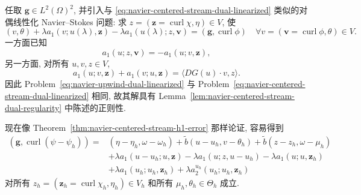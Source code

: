 \begin{Proof}
任取 $\boldsymbol g\in L^2(\Omega)^2$, 并引入与
\eqref{eq:navier-centered-stream-dual-linearized} 类似的对偶线性化 Navier--Stokes 问题:
求 $z=(\boldsymbol z=\operatorname{curl}\chi,\eta)\in V$, 使
\begin{equation}\label{eq:navier-upwind-dual-linearized}
(v,\theta)+\lambda a_1(v;u(\lambda),\boldsymbol z)
-\lambda a_1(u(\lambda);z,\boldsymbol v)
=(\boldsymbol g,\operatorname{curl}\phi)
\quad\forall v=(\boldsymbol v=\operatorname{curl}\phi,\theta)\in V.
\end{equation}
一方面已知
\[
a_1(u;z,\boldsymbol v)=-a_1(u;v,\boldsymbol z),
\]
另一方面, 对所有 $u,v,z\in V$,
\[
a_1(u;v,\boldsymbol z)+a_1(v;u,\boldsymbol z)
=\langle DG(u)\cdot v,z\rangle.
\]
因此 Problem~\eqref{eq:navier-upwind-dual-linearized} 与
Problem~\eqref{eq:navier-centered-stream-dual-linearized} 相同,
故其解具有 Lemma~\ref{lem:navier-centered-stream-dual-regularity} 中陈述的正则性.

现在像 Theorem~\ref{thm:navier-centered-stream-h1-error} 那样论证, 容易得到
\[
\begin{aligned}
(\boldsymbol g,\operatorname{curl}(\psi-\psi_h))
={}&(\eta-\eta_h,\omega-\omega_h)
+\widetilde b(u-u_h,v-\theta_h)
+\widetilde b(z-z_h,\omega-\mu_h)\\
&+\lambda a_1(u-u_h;u,\boldsymbol z)
-\lambda a_1(u;z,u-u_h)
-\lambda a_1(u;u,\boldsymbol z_h)\\
&+\lambda a_1(u_h;u_h,\boldsymbol z_h)
+\lambda a_2^{u_h}(u_h;u_h,\boldsymbol z_h)
\end{aligned}
\]
对所有 $z_h=(\boldsymbol z_h=\operatorname{curl}\chi_h,\eta_h)\in V_h$
和所有 $\mu_h,\theta_h\in\Theta_h$ 成立.


\end{Proof}
